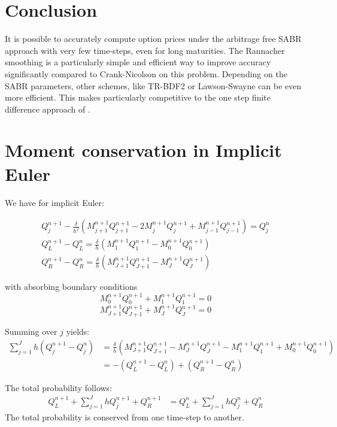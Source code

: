 \documentclass[]{rAMF2e}
\begin{document}
\section{Conclusion}
It is possible to accurately compute option prices under the arbitrage free SABR approach with very few time-steps, even for long maturities. The Rannacher smoothing is a particularly simple and efficient way to improve accuracy significantly compared to Crank-Nicolson on this problem. Depending on the SABR parameters, other schemes, like TR-BDF2 or Lawson-Swayne can be even more efficient.
This makes \citep{hagan2013arbitrage} particularly competitive to the one step finite difference approach of \citep{andreasen2011zabr}.

%

\newpage
\appendix
\section{Moment conservation in Implicit Euler}
We have for implicit Euler:

\begin{eqnarray}
Q_j^{n+1} - \frac{\delta}{h^2}\left(M_{j+1}^{n+1}Q_{j+1}^{n+1}-2M_j^{n+1}Q_j^{n+1}+M_{j-1}^{n+1}Q_{j-1}^{n+1}\right) = Q_j^n \\
Q_L^{n+1}-Q_L^n = \frac{\delta}{h}\left(M_1^{n+1}Q_1^{n+1}-M_0^{n+1}Q_0^{n+1}\right)\\
Q_R^{n+1}-Q_R^n = \frac{\delta}{h}\left(M_{J+1}^{n+1}Q_{J+1}^{n+1}-M_{J}^{n+1}Q_J^{n+1}\right)
\end{eqnarray}

with absorbing boundary conditions
$$M_0^{n+1}Q_0^{n+1} + M_1^{n+1}Q_1^{n+1} = 0 $$
$$M_{J+1}^{n+1}Q_{J+1}^{n+1} + M_J^{n+1}Q_J^{n+1} = 0 $$

Summing over $j$ yields:
\begin{align}
\sum_{j=1}^{J} h (Q_j^{n+1}-Q_j^n) &= \frac{\delta}{h}\left(M_{J+1}^{n+1}Q_{J+1}^{n+1}-M_J^{n+1}Q_J^{n+1}-M_1^{n+1}Q_1^{n+1}+M_0^{n+1}Q_0^{n+1}\right)\\
&= -(Q_L^{n+1}-Q_L^n)+(Q_R^{n+1}-Q_R^n)
\end{align}

The total probability follows:
\begin{align}
Q_L^{n+1}+\sum_{j=1}^J hQ_j^{n+1} + Q_R^{n+1} &= Q_L^{n}+\sum_{j=1}^J hQ_j^{n} + Q_R^{n} 
\end{align}
The total probability is conserved from one time-step to another.
\end{document}
